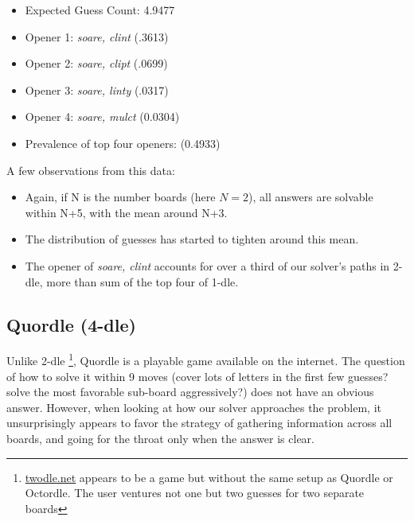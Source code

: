 \documentclass[11pt, oneside]{article} 	%
\begin{document}
\begin{itemize}
\item Expected Guess Count: 4.9477
\item Opener 1: \emph{soare, clint} (.3613)
\item Opener 2: \emph{soare, clipt} (.0699)
\item Opener 3: \emph{soare, linty} (.0317)
\item Opener 4: \emph{soare, mulct} (0.0304)
\item Prevalence of top four openers: (0.4933)
\end{itemize}

A few observations from this data:
\begin{itemize}
\item Again, if N is the number boards (here $N=2$), all answers are solvable within N+5, with the mean around N+3.
\item The distribution of guesses has started to tighten around this mean. 
\item The opener of \emph{soare, clint} accounts for over a third of our solver's paths in 2-dle, more than sum of the top four of 1-dle. 
\end{itemize}


\subsection{Quordle (4-dle)}

Unlike 2-dle \footnote{\url{twodle.net} appears to be a game but without the same setup as Quordle or Octordle. The user ventures not one but two guesses for two separate boards}, Quordle is a playable game available on the internet. The question of how to solve it within 9 moves (cover lots of letters in the first few guesses? solve the most favorable sub-board aggressively?) does not have an obvious answer. However, when looking at how our solver approaches the problem, it unsurprisingly appears to favor the strategy of gathering information across all boards, and going for the throat only when the answer is clear.
\end{document}
